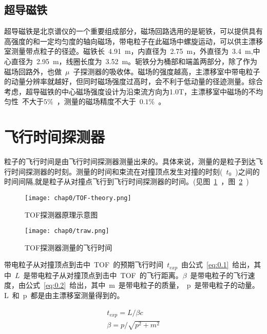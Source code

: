 \subsection{超导磁铁}

超导磁铁是北京谱仪的一个重要组成部分，磁场回路选用的是轭铁，可以提供具有高强度的和一定均匀度的轴向磁场，带电粒子在此磁场中螺旋运动，可以供主漂移室测量带点粒子的径迹。磁铁长~4.91~m，内直径为~2.75~m，外直径为~3.4~m,中心直径为~2.95~m，线圈长度为~3.52~m。轭铁分为桶部和端盖两部分，除了作为磁场回路外，也做~$\mu$~子探测器的吸收体。磁场的强度越高，主漂移室中带电粒子的动量分辨率就越好，但同时磁场强度过高时，会不利于低动量的径迹测量。综合考虑，超导磁铁的中心磁场强度设计为沿束流方向为1.0T，主漂移室中磁场的不均匀性~不大于$5\%$~，测量的磁场精度不大于~$0.1\%$~。

\section{飞行时间探测器}

粒子的飞行时间是由飞行时间探测器测量出来的。具体来说，测量的是粒子到达飞行时间探测器的时刻。测量的时间和束流在对撞顶点发生对撞的时刻(~$t_{0}$~)之间的时间间隔,就是粒子从对撞点飞行到飞行时间探测器的时间。(见图~\ref{fig:TOF-theory}~，图~\ref{fig:traw}~)

\begin{figure}[!h]
  \centering
  \texttt{[image: chap0/TOF-theory.png]}
  \caption{TOF探测器原理示意图}
  \label{fig:TOF-theory}
\end{figure}

\begin{figure}[!h]
  \centering
  \texttt{[image: chap0/traw.png]}
  \caption{TOF探测器测量的飞行时间}
  \label{fig:traw}
\end{figure}

带电粒子从对撞顶点到击中~TOF~的预期飞行时间~$t_{exp}$~由公式~\ref{eq:0.1}~给出，其中~$L$~是带电粒子从对撞顶点到击中~TOF~的飞行距离。$\beta$~是带电粒子的飞行速度，由公式~\ref{eq:0.2}~给出，其中~m~是带电粒子的质量，~p~是带电粒子的动量。L~和~p~都是由主漂移室测量得到的。

\begin{align}
t_{exp}=L/\beta c 
\label{eq:0.1}\\
\beta=p/\sqrt {p^{2}+m^{2}}
\label{eq:0.2}
\end{align}

